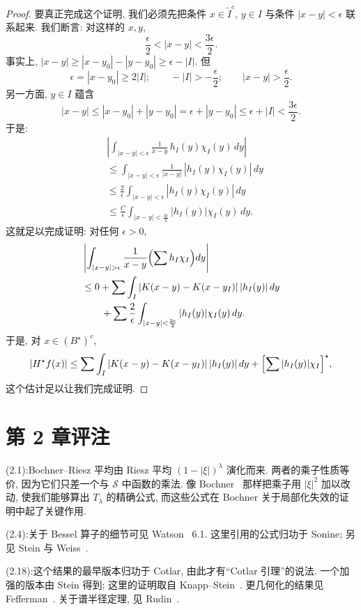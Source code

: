 \begin{proof}
要真正完成这个证明, 我们必须先把条件 $x\in\tilde{I}^{c}$, $y\in I$ 与条件 $|x-y|<\epsilon$ 联系起来. 我们断言: 对这样的 $x,y$,
\[
\frac{\epsilon}{2}<|x-y|<\frac{3\epsilon}{2}.
\]
事实上, $|x-y|\geq|x-y_{0}|-|y-y_{0}|\geq\epsilon-|I|$. 但
\[
\epsilon=|x-y_{0}|\geq 2|I|;\qquad -|I|>-\frac{\epsilon}{2};\qquad |x-y|>\frac{\epsilon}{2}.
\]
另一方面, $y\in I$ 蕴含
\[
|x-y|\leq|x-y_{0}|+|y-y_{0}|=\epsilon+|y-y_{0}|\leq\epsilon+|I|<\frac{3\epsilon}{2}.
\]
于是:
\begin{align*}
&\left|\int_{|x-y|<\epsilon}\frac{1}{x-y}\,h_{I}(y)\chi_{I}(y)\,dy\right| \\
&\leq\int_{|x-y|<\epsilon}\frac{1}{|x-y|}\,|h_{I}(y)\chi_{I}(y)|\,dy \\
&\leq\frac{2}{\epsilon}\int_{|x-y|<\epsilon}|h_{I}(y)\chi_{I}(y)|\,dy \\
&\leq\frac{C}{\epsilon}\int_{|x-y|<\frac{3\epsilon}{2}}|h_{I}(y)|\chi_{I}(y)\,dy.
\end{align*}
这就足以完成证明: 对任何 $\epsilon>0$,
\begin{align*}
&\left|\int_{|x-y|>\epsilon}\frac{1}{x-y}\Bigl(\sum h_{I}\chi_{I}\Bigr)dy\right| \\
&\leq 0+\sum\int_{I}|K(x-y)-K(x-y_{I})|\,|h_{I}(y)|\,dy \\
&\qquad+\sum\frac{2}{\epsilon}\int_{|x-y|<\frac{3\epsilon}{2}}|h_{I}(y)|\chi_{I}(y)\,dy.
\end{align*}
于是, 对 $x\in(B^{\star})^{c}$,
\[
|H^{\star}f(x)|\leq\sum\int_{I}|K(x-y)-K(x-y_{I})|\,|h_{I}(y)|\,dy
+\Bigl[\sum|h_{I}(y)|\chi_{I}\Bigr]^{\star},
\]
这个估计足以让我们完成证明.
\end{proof}

\section{第 2 章评注}
\label{sec:2.6}

\noindent (2.1):\quad Bochner--Riesz 平均由 Riesz 平均 $(1-|\xi|)^{\lambda}$ 演化而来. 两者的乘子性质等价, 因为它们只差一个与 $\mathcal{S}$ 中函数的乘法. 像 Bochner~\cite{bochner} 那样把乘子用 $|\xi|^2$ 加以改动, 使我们能够算出 $T_\lambda$ 的精确公式, 而这些公式在 Bochner 关于局部化失效的证明中起了关键作用.

\noindent (2.4):\quad 关于 Bessel 算子的细节可见 Watson~\cite{watson} 6.1. 这里引用的公式归功于 Sonine; 另见 Stein 与 Weiss~\cite{steinweiss}.

\noindent (2.18):\quad 这个结果的最早版本归功于 Cotlar, 由此才有``Cotlar 引理''的说法. 一个加强的版本由 Stein 得到; 这里的证明取自 Knapp--Stein~\cite{knapp-stein}. 更几何化的结果见 Fefferman~\cite{fefferman-pointwise}. 关于谱半径定理, 见 Rudin~\cite{rudinfa}.

